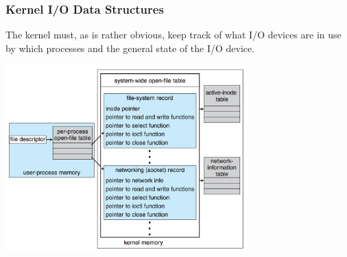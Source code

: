 \begin{frame}
\frametitle{Kernel I/O Data Structures}
The kernel must, as is rather obvious, keep track of what I/O devices are in use by which processes and the general state of the I/O device.

\begin{center}
	\includegraphics[width=0.7\textwidth]{images/unix-io-kernel.png}
\end{center}


\end{frame}



